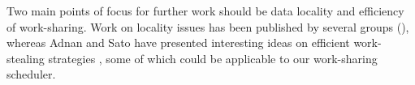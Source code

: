 \documentclass{acm_proc_article-sp}
\begin{document}
Two main points of focus for further work should be data locality and
efficiency of work-sharing. Work on locality issues has been published by
several groups (\cite{Olivier:2012:OTS:2237840.2237846, 5470425, 4536188,
Acar:locality}), whereas Adnan and Sato have presented interesting ideas on
efficient work-stealing strategies \cite{6008879}, some of which could be
applicable to our work-sharing scheduler.



\end{document}
